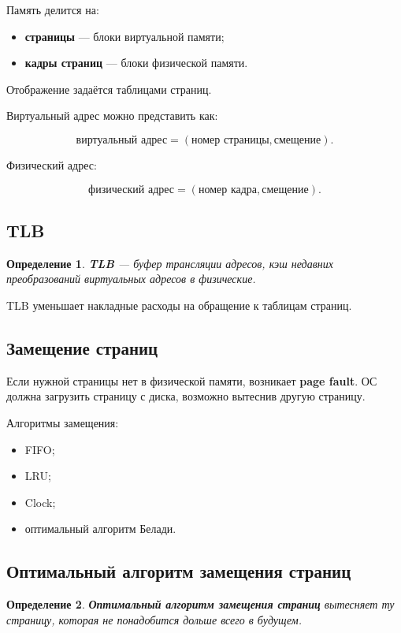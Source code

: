 \documentclass[12pt,a4paper]{article}
\newtheorem{definition}{Определение}
\begin{document}
Память делится на:

\begin{itemize}
    \item \textbf{страницы} --- блоки виртуальной памяти;
    \item \textbf{кадры страниц} --- блоки физической памяти.
\end{itemize}

Отображение задаётся таблицами страниц.

Виртуальный адрес можно представить как:

\[
\text{виртуальный адрес} = (\text{номер страницы}, \text{смещение}).
\]

Физический адрес:

\[
\text{физический адрес} = (\text{номер кадра}, \text{смещение}).
\]

\subsection{TLB}

\begin{definition}
\textbf{TLB} --- буфер трансляции адресов, кэш недавних преобразований виртуальных адресов в физические.
\end{definition}

TLB уменьшает накладные расходы на обращение к таблицам страниц.

\subsection{Замещение страниц}

Если нужной страницы нет в физической памяти, возникает \textbf{page fault}. ОС должна загрузить страницу с диска, возможно вытеснив другую страницу.

Алгоритмы замещения:

\begin{itemize}
    \item FIFO;
    \item LRU;
    \item Clock;
    \item оптимальный алгоритм Белади.
\end{itemize}

\subsection{Оптимальный алгоритм замещения страниц}

\begin{definition}
\textbf{Оптимальный алгоритм замещения страниц} вытесняет ту страницу, которая не понадобится дольше всего в будущем.
\end{definition}
\end{document}

